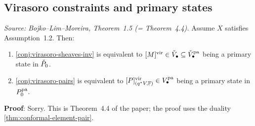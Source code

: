 \subsection{Virasoro constraints and primary states}


\begin{theorem}[VirasoroConstraintsAsPrimaryStates]
  \label{thm:virasoro-primary}
  \textit{Source: Bojko--Lim--Moreira, Theorem~1.5 (= Theorem~4.4).}
  Assume \(X\) satisfies Assumption~1.2. Then:
  \begin{enumerate}
  \item \cref{conj:virasoro-sheaves-inv} is equivalent to
        \([M]^\vir \in \widecheck{V}_\bullet \subseteq \widecheck{V}_\bullet^\pa\)
        being a primary state in \(\widecheck{P}_0\).
  \item \cref{conj:virasoro-pairs} is equivalent to
        \([P]^\vir_{(q^*V, \mathbb{F})} \in V_\bullet^\pa\)
        being a primary state in \(P_0^\pa\).
  \end{enumerate}

  \textbf{Proof}: Sorry. This is Theorem~4.4 of the paper; the proof uses the duality
  \cref{thm:conformal-element-pair}.
\end{theorem}

